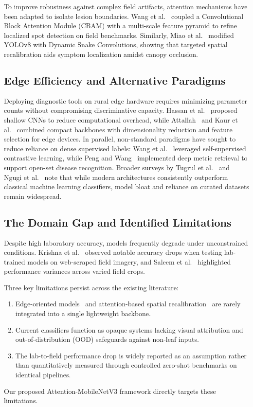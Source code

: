 \documentclass[conference]{IEEEtran}
\begin{document}
To improve robustness against complex field artifacts, attention mechanisms have been adapted to isolate lesion boundaries. Wang et al.~\cite{ref8} coupled a Convolutional Block Attention Module (CBAM) with a multi-scale feature pyramid to refine localized spot detection on field benchmarks. Similarly, Miao et al.~\cite{ref10} modified YOLOv8 with Dynamic Snake Convolutions, showing that targeted spatial recalibration aids symptom localization amidst canopy occlusion.

\subsection{Edge Efficiency and Alternative Paradigms}
Deploying diagnostic tools on rural edge hardware requires minimizing parameter counts without compromising discriminative capacity. Hassan et al.~\cite{ref5} proposed shallow CNNs to reduce computational overhead, while Attallah~\cite{ref6} and Kaur et al.~\cite{ref11} combined compact backbones with dimensionality reduction and feature selection for edge devices. In parallel, non-standard paradigms have sought to reduce reliance on dense supervised labels: Wang et al.~\cite{ref12} leveraged self-supervised contrastive learning, while Peng and Wang~\cite{ref13} implemented deep metric retrieval to support open-set disease recognition. Broader surveys by Tugrul et al.~\cite{ref14} and Ngugi et al.~\cite{ref15} note that while modern architectures consistently outperform classical machine learning classifiers, model bloat and reliance on curated datasets remain widespread.

\subsection{The Domain Gap and Identified Limitations}
Despite high laboratory accuracy, models frequently degrade under unconstrained conditions. Krishna et al.~\cite{ref7} observed notable accuracy drops when testing lab-trained models on web-scraped field imagery, and Saleem et al.~\cite{ref9} highlighted performance variances across varied field crops. 

Three key limitations persist across the existing literature:
\begin{enumerate}
    \item Edge-oriented models~\cite{ref5, ref6, ref11} and attention-based spatial recalibration~\cite{ref8, ref10} are rarely integrated into a single lightweight backbone.
    \item Current classifiers function as opaque systems lacking visual attribution and out-of-distribution (OOD) safeguards against non-leaf inputs.
    \item The lab-to-field performance drop is widely reported as an assumption rather than quantitatively measured through controlled zero-shot benchmarks on identical pipelines.
\end{enumerate}
Our proposed Attention-MobileNetV3 framework directly targets these limitations.
\end{document}

